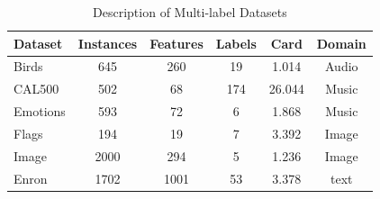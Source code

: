 \documentclass[12pt,a4paper,oneside,english]{report}
\begin{document}
\begin{table}[htbp]
	\caption{Description of Multi-label Datasets}
	\begin{center}
		\begin{tabular}{|l|c|c|c|c|c|}
			\hline
			\textbf{Dataset } & \textbf{ Instances }& \textbf{ Features }& \textbf{ Labels }& \textbf{ Card } & \textbf{ Domain } \\
			\hline
			Birds & 645 &260 &19 & 1.014& Audio\\
			CAL500 & 502& 68& 174& 26.044& Music\\
			Emotions  & 593& 72& 6& 1.868& Music\\
			Flags & 194& 19& 7& 3.392& Image\\
			Image & 2000& 294& 5& 1.236& Image\\
			Enron & 1702  & 1001 & 53 & 3.378& text \\
			\hline
		\end{tabular}
		\label{table:14}
	\end{center}
\end{table}
\end{document}
